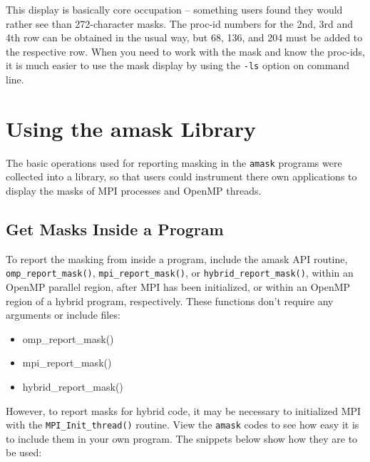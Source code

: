 \documentclass[10pt,a4paper]{report}
\begin{document}
This display is basically core occupation -- something users found they would rather see than 272-character masks.
The proc-id numbers for the 2nd, 3rd and 4th row can be obtained in the usual 
way, but 68, 136, and 204 must be added to the respective row.  
When you need to work with the mask and know the proc-ids, it is much easier 
to use the mask display by using the \verb+-ls+ option on command line. 

\FloatBarrier
\chapter{Using the amask Library}

The basic operations used for reporting masking in the \verb+amask+ programs
were collected into a library, so that users
could instrument there own applications to display the masks of MPI processes
and OpenMP threads.

 

\section{Get Masks Inside a Program}

To report the masking from inside a program, include the amask API routine, \verb+omp_report_mask()+,
\verb+mpi_report_mask()+, or \verb+hybrid_report_mask()+, within an OpenMP parallel region, after MPI has been
initialized, or within an OpenMP region of a hybrid program, respectively.  These functions don't
require any arguments or include files:  

\begin{itemize}
\item omp\_report\_mask()
\item mpi\_report\_mask()
\item hybrid\_report\_mask()
\end{itemize}



However, to report masks for hybrid code, it may be necessary
to initialized MPI with the \verb+MPI_Init_thread()+ routine. View the \verb+amask+ codes to see how easy
it is to include them in your own program. The snippets below show how they are to be used:
\end{document}
